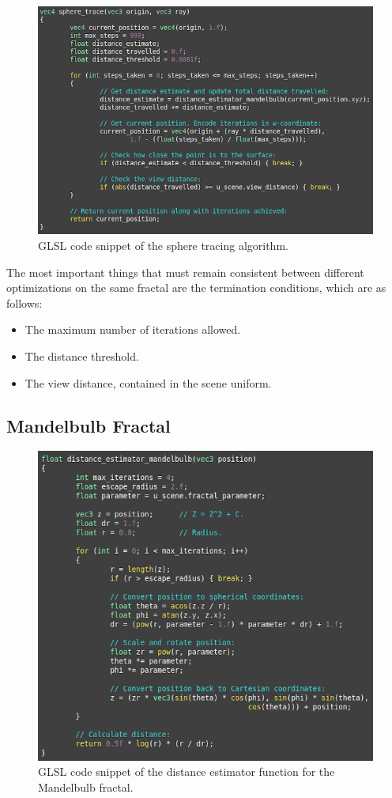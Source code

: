\begin{figure}[ht]
	\centering
	\includegraphics[width=0.65\linewidth, frame]{Images/GLSL-Sphere-Tracing.png}
	\caption{GLSL code snippet of the sphere tracing algorithm.}
	\label{figure:glsl-sphere-tracing}
\end{figure}

The most important things that must remain consistent between different optimizations on the same fractal are the termination conditions, which are as follows:

\begin{itemize}
	\item The maximum number of iterations allowed.
	\item The distance threshold.
	\item The view distance, contained in the scene uniform.
\end{itemize}

\subsection{Mandelbulb Fractal}

\begin{figure}[ht]
	\centering
	\includegraphics[width=0.65\linewidth, frame]{Images/GLSL-Distance-Estimator-Mandelbulb.png}
	\caption{GLSL code snippet of the distance estimator function for the Mandelbulb fractal.}
	\label{figure:glsl-distance-estimator-mandelbulb}
\end{figure}

